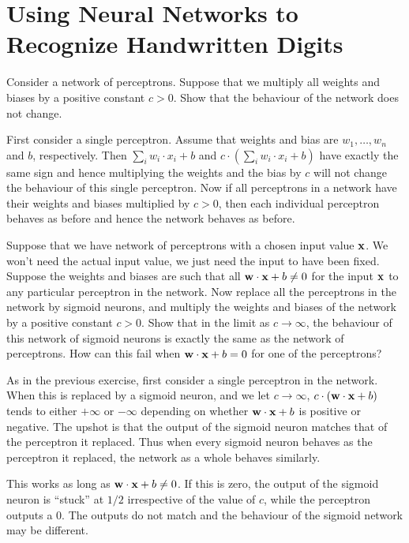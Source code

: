 \chapter{Using Neural Networks to Recognize Handwritten Digits}

\begin{exercise} Consider a network of perceptrons. Suppose that
we multiply all weights and biases by a positive constant $c > 0$. Show 
that the behaviour of the network does not change.
\end{exercise}
\begin{solution}
First consider a single perceptron. Assume that weights and bias are $w_1,
\ldots, w_n$ and $b$, respectively. Then $\sum_i w_i \cdot x_i + b$ and $c
\cdot (\sum_i w_i \cdot x_i + b)$ have exactly the same sign and hence
multiplying the weights and the bias by $c$ will not change the behaviour of
this single perceptron. Now if all perceptrons in a network have their weights
and biases multiplied by $c > 0$, then each individual perceptron behaves as
before and hence the network behaves as before.  
\end{solution}

\begin{exercise}
Suppose that we have network of perceptrons with a chosen input value
$\mathbf{x}$. We won’t need the actual input value, we just need the input to
have been fixed. Suppose the weights and biases are such that all $\mathbf{w}
\cdot \mathbf{x} + b \neq 0$ for the input $\mathbf{x}$ to any particular
perceptron in the network. Now replace all the perceptrons in the network by
sigmoid neurons, and multiply the weights and biases of the network by a
positive constant $c > 0$. Show that in the limit as $c \to \infty$, the 
behaviour of this network of sigmoid neurons is exactly the same as the network
of perceptrons. How can this fail when $\mathbf{w} \cdot \mathbf{x} + b = 0$ for
one of the perceptrons?
\end{exercise}
\begin{solution}
As in the previous exercise, first consider a single perceptron in the network. 
When this is replaced by a sigmoid neuron, and we let $c \to \infty$, 
$c \cdot (\mathbf{w} \cdot \mathbf{x} + b)$ tends to either $+ \infty$ or $- \infty$
depending on whether $\mathbf{w} \cdot \mathbf{x} + b$ is positive or negative. The 
upshot is that the output of the sigmoid neuron matches that of the perceptron 
it replaced. Thus when every sigmoid neuron behaves as the perceptron it replaced, 
the network as a whole behaves similarly. 

This works as long as $\mathbf{w} \cdot \mathbf{x} + b \neq 0$. If this is zero, the 
output of the sigmoid neuron is ``stuck'' at $1/2$ irrespective of the value of $c$, 
while the perceptron outputs a $0$. The outputs do not match and the behaviour 
of the sigmoid network may be different. 
\end{solution}


